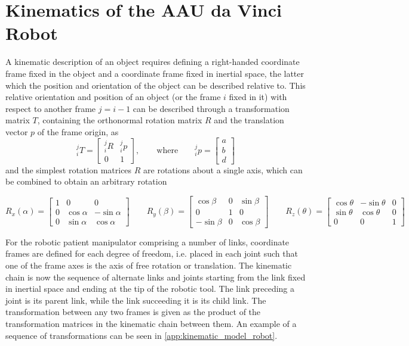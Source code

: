 \section{Kinematics of the AAU da Vinci Robot}
A kinematic description of an object requires defining a right-handed coordinate frame fixed in the object and a coordinate frame fixed in inertial space, the latter which the position and orientation of the object can be described relative to. This relative orientation and position of an object (or the frame $i$ fixed in it) with respect to another frame $j=i-1$ can be described through a transformation matrix $T$, containing the orthonormal rotation matrix $R$ and the translation vector $p$ of the frame origin, as 
\begin{equation}
^j_iT = 
\begin{bmatrix}
^j_iR & ^j_ip\\
0 & 1
\end{bmatrix}, \label{eq:kin_transformation}
\qquad \text{where} \qquad
^j_ip = 
\begin{bmatrix}
a\\b\\d
\end{bmatrix}
\end{equation}
and the simplest rotation matrices $R$ are rotations about a single axis, which can be combined to obtain an arbitrary rotation
\begin{small}
	\begin{equation}
	R_x(\alpha) = 
	\begin{bmatrix}
	1 & 0 & 0\\
	0 & \cos\alpha & -\sin\alpha\\
	0 & \sin\alpha & \cos\alpha
	\end{bmatrix} 
	\qquad
	R_y(\beta) = 
	\begin{bmatrix}
	\cos\beta & 0 & \sin\beta \\
	0 & 1 & 0\\
	-\sin\beta & 0 & \cos\beta
	\end{bmatrix}
	\qquad
	R_z(\theta) = 
	\begin{bmatrix}
	\cos\theta & -\sin\theta & 0\\
	\sin\theta & \cos\theta & 0\\
	0 & 0 & 1
	\end{bmatrix}
	\label{eq:RxRyRz_chapter}
	\end{equation}
\end{small}

For the robotic patient manipulator comprising a number of links, coordinate frames are defined for each degree of freedom, i.e. placed in each joint such that one of the frame axes is the axis of free rotation or translation. The kinematic chain is now the sequence of alternate links and joints starting from the link fixed in inertial space and ending at the tip of the robotic tool. The link preceding a joint is its parent link, while the link succeeding it is its child link. The transformation between any two frames is given as the product of the transformation matrices in the kinematic chain between them. An example of a sequence of transformations can be seen in \autoref{app:kinematic_model_robot}.

